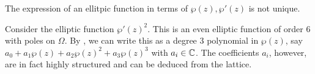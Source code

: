 \begin{remark}
    The expression of an ellitpic function in terms of $\wp(z),\wp'(z)$ is not unique. 
\end{remark}
Consider the elliptic function $\wp'(z)^{2}$. This is an even elliptic function of order 6 with poles on $\Omega$. By , we can write this as a degree 3 polynomial in $\wp(z)$, say $a_{0}+a_{1}\wp(z)+a_{2}\wp(z)^{2}+a_{3}\wp(z)^{3}$ with $a_{i}\in\mathbb{C}$. The coefficients $a_{i}$, however, are in fact highly structured and can be deduced from the lattice. 